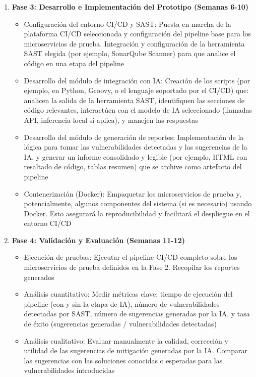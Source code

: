 \begin{enumerate}
    \item \textbf{Fase 3: Desarrollo e Implementación del Prototipo (Semanas 6-10)}
    \begin{itemize}
        \item Configuración del entorno CI/CD y SAST: Puesta en marcha de la plataforma CI/CD seleccionada y configuración del pipeline base para los microservicios de prueba. Integración y configuración de la herramienta SAST elegida (por ejemplo, SonarQube Scanner) para que analice el código en una etapa del pipeline
        \item Desarrollo del módulo de integración con IA: Creación de los scripts (por ejemplo, en Python, Groovy, o el lenguaje soportado por el CI/CD) que: analicen la salida de la herramienta SAST, identifiquen las secciones de código relevantes, interactúen con el modelo de IA seleccionado (llamadas API, inferencia local si aplica), y manejen las respuestas
        \item Desarrollo del módulo de generación de reportes: Implementación de la lógica para tomar las vulnerabilidades detectadas y las sugerencias de la IA, y generar un informe consolidado y legible (por ejemplo, HTML con resaltado de código, tablas resumen) que se archive como artefacto del pipeline
        \item Contenerización (Docker): Empaquetar los microservicios de prueba y, potencialmente, algunos componentes del sistema (si es necesario) usando Docker. Esto asegurará la reproducibilidad y facilitará el despliegue en el entorno CI/CD
    \end{itemize}
    
    \item \textbf{Fase 4: Validación y Evaluación (Semanas 11-12)}
    \begin{itemize}
        \item Ejecución de pruebas: Ejecutar el pipeline CI/CD completo sobre los microservicios de prueba definidos en la Fase 2. Recopilar los reportes generados
        \item Análisis cuantitativo: Medir métricas clave: tiempo de ejecución del pipeline (con y sin la etapa de IA), número de vulnerabilidades detectadas por SAST, número de sugerencias generadas por la IA, y tasa de éxito (sugerencias generadas / vulnerabilidades detectadas)
        \item Análisis cualitativo: Evaluar manualmente la calidad, corrección y utilidad de las sugerencias de mitigación generadas por la IA. Comparar las sugerencias con las soluciones conocidas o esperadas para las vulnerabilidades introducidas
    \end{itemize}
\end{enumerate}